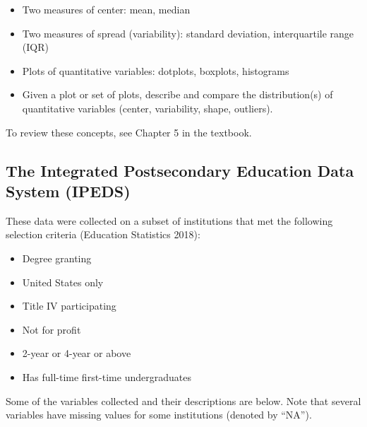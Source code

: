 \documentclass[
]{report}
\begin{document}
\begin{itemize}
\item
  Two measures of center: mean, median
\item
  Two measures of spread (variability): standard deviation, interquartile range (IQR)
\item
  Plots of quantitative variables: dotplots, boxplots, histograms
\item
  Given a plot or set of plots, describe and compare the distribution(s)
  of quantitative variables
  (center, variability, shape, outliers).
\end{itemize}

To review these concepts, see Chapter 5 in the textbook.

\subsection{The Integrated Postsecondary Education Data System (IPEDS)}\label{the-integrated-postsecondary-education-data-system-ipeds}

These data were collected on a subset of institutions that met the following selection criteria (Education Statistics 2018):

\begin{itemize}
\item
  Degree granting
\item
  United States only
\item
  Title IV participating
\item
  Not for profit
\item
  2-year or 4-year or above
\item
  Has full-time first-time undergraduates
\end{itemize}

Some of the variables collected and their descriptions are below. Note that several variables have missing values for some institutions (denoted by ``NA'').
\end{document}
